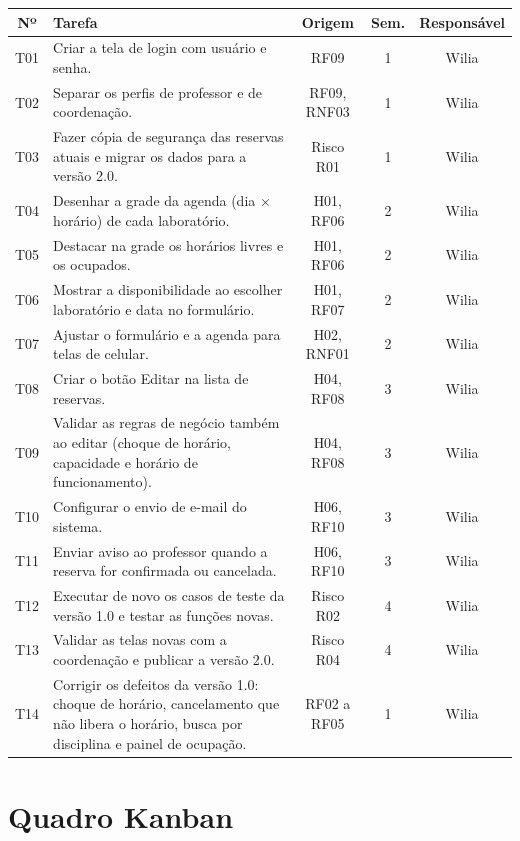 \documentclass[a4paper,12pt]{article}
\begin{document}
\begin{xltabular}{\linewidth}{|c|Y|c|c|c|}
  \hline
  \textbf{Nº} & \textbf{Tarefa} & \textbf{Origem} & \textbf{Sem.} & \textbf{Responsável} \\ \hline
  T01 & Criar a tela de login com usuário e senha. & RF09 & 1 & Wilia \\ \hline
  T02 & Separar os perfis de professor e de coordenação. & RF09, RNF03 & 1 & Wilia \\ \hline
  T03 & Fazer cópia de segurança das reservas atuais e migrar os dados para a versão 2.0. & Risco R01 & 1 & Wilia \\ \hline
  T04 & Desenhar a grade da agenda (dia $\times$ horário) de cada laboratório. & H01, RF06 & 2 & Wilia \\ \hline
  T05 & Destacar na grade os horários livres e os ocupados. & H01, RF06 & 2 & Wilia \\ \hline
  T06 & Mostrar a disponibilidade ao escolher laboratório e data no formulário. & H01, RF07 & 2 & Wilia \\ \hline
  T07 & Ajustar o formulário e a agenda para telas de celular. & H02, RNF01 & 2 & Wilia \\ \hline
  T08 & Criar o botão Editar na lista de reservas. & H04, RF08 & 3 & Wilia \\ \hline
  T09 & Validar as regras de negócio também ao editar (choque de horário, capacidade e horário de funcionamento). & H04, RF08 & 3 & Wilia \\ \hline
  T10 & Configurar o envio de e-mail do sistema. & H06, RF10 & 3 & Wilia \\ \hline
  T11 & Enviar aviso ao professor quando a reserva for confirmada ou cancelada. & H06, RF10 & 3 & Wilia \\ \hline
  T12 & Executar de novo os casos de teste da versão 1.0 e testar as funções novas. & Risco R02 & 4 & Wilia \\ \hline
  T13 & Validar as telas novas com a coordenação e publicar a versão 2.0. & Risco R04 & 4 & Wilia \\ \hline
  T14 & Corrigir os defeitos da versão 1.0: choque de horário, cancelamento que não libera o horário, busca por disciplina e painel de ocupação. & RF02 a RF05 & 1 & Wilia \\ \hline
\end{xltabular}

\section{Quadro Kanban}
\end{document}
